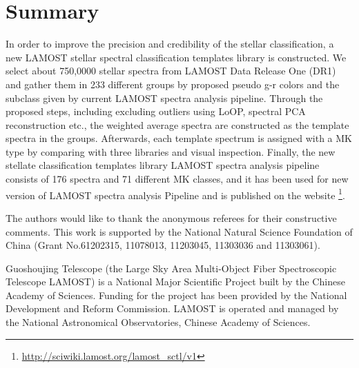 \documentclass[manuscript]{aastex}
\begin{document}
\section{Summary}
\label{sect:Summary}
In order to improve the precision  and credibility  of the stellar classification,
a new LAMOST stellar spectral classification templates library is constructed.
We select about 750,0000 stellar spectra from LAMOST Data Release One  (DR1) and gather them  in 233 different groups by proposed pseudo g-r colors and the subclass given by current LAMOST spectra analysis pipeline.
Through the proposed steps, including excluding outliers using LoOP, spectral PCA reconstruction etc.,
the weighted average spectra are constructed as the template spectra in the groups.
Afterwards, each template spectrum  is assigned with a MK type by comparing with three libraries and visual inspection.
Finally, the new stellate classification templates library LAMOST spectra analysis pipeline consists of 176 spectra and 71 different MK classes,
and it has been used for new version of LAMOST spectra analysis Pipeline and is published on the website \footnote{\url{http://sciwiki.lamost.org/lamost_sctl/v1}}.




\acknowledgments

The authors would like to thank the anonymous referees for their constructive comments.
This work is supported by the National Natural Science Foundation of China  (Grant No.61202315, 11078013, 11203045, 11303036 and 11303061).

 Guoshoujing Telescope  (the Large Sky Area Multi-Object Fiber Spectroscopic Telescope LAMOST) is a National Major Scientific Project built by the Chinese Academy of Sciences.
 Funding for the project has been provided by the National Development and Reform Commission.
 LAMOST is operated and managed by the National Astronomical Observatories, Chinese Academy of Sciences.
\end{document}
